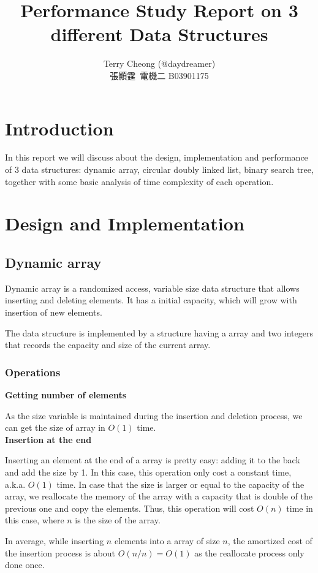 \documentclass{article}
\title{Performance Study Report on 3 different Data Structures}
\author{Terry Cheong (@daydreamer)\\
		張顥霆\ 電機二 B03901175}
\begin{document}
	\maketitle
	\section{Introduction}
	In this report we will discuss about the design, implementation and performance of 3 data structures: dynamic array, circular doubly linked list, binary search tree, together with some basic analysis of time complexity of each operation. 
	\section{Design and Implementation}		
	\subsection{Dynamic array}   	
   	Dynamic array is a randomized access, variable size data structure that allows inserting and deleting elements. It has a initial capacity, which will grow with insertion of new elements.
   
   	The data structure is implemented by a structure having a array and two integers that records the capacity and size of the current array. 
   	\subsubsection{Operations}
   	\textbf{Getting number of elements} 
   	
   		As the size variable is maintained during the insertion and deletion process, we can get the size of array in $O(1)$ time.\\
   		
	\noindent    
   	\textbf{Insertion at the end}
   	
   	 Inserting an element at the end of a array is pretty easy: adding it to the back and add the size by 1. In this case, this operation only cost a constant time, a.k.a. $O(1)$ time.
   	 In case that the size is larger or equal to the capacity of the array, we reallocate the memory of the array with a capacity that is double of the previous one and copy the elements. Thus, this operation will cost $O(n)$ time in this case, where $n$ is the size of the array.
   	 
   	 In average, while inserting $n$ elements into a array of size $n$, the amortized cost of the insertion process is about $O(n/n) = O(1)$ as the reallocate process only done once. 
   	 
\end{document}
